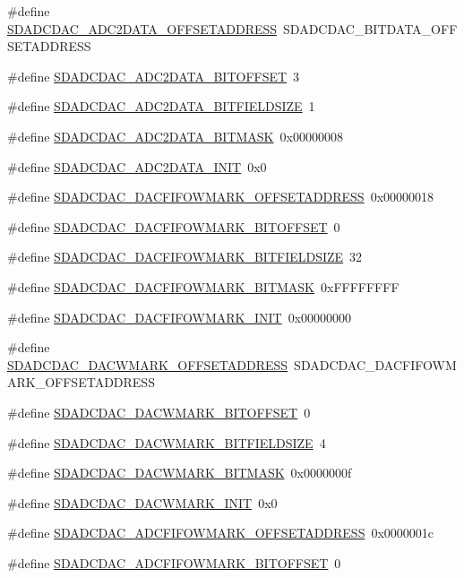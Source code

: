 \begin{DoxyCompactItemize}
\#define \hyperlink{a00569_a4b0d247763c945bcaf18e4bfa457e02b}{SDADCDAC\_\-ADC2DATA\_\-OFFSETADDRESS}~SDADCDAC\_\-BITDATA\_\-OFFSETADDRESS
\item 
\#define \hyperlink{a00569_a5b7ca50aa8e2de758a93edbd0c895710}{SDADCDAC\_\-ADC2DATA\_\-BITOFFSET}~3
\item 
\#define \hyperlink{a00569_aad45e46c76bcfe75f7e878228c30dbbb}{SDADCDAC\_\-ADC2DATA\_\-BITFIELDSIZE}~1
\item 
\#define \hyperlink{a00569_a8f0366c01e089c6281a66cbfcfcb833d}{SDADCDAC\_\-ADC2DATA\_\-BITMASK}~0x00000008
\item 
\#define \hyperlink{a00569_a53134035732160951d9c3d9c22896bbd}{SDADCDAC\_\-ADC2DATA\_\-INIT}~0x0
\item 
\#define \hyperlink{a00569_a68bfa2d51b499a57032027f8484bc441}{SDADCDAC\_\-DACFIFOWMARK\_\-OFFSETADDRESS}~0x00000018
\item 
\#define \hyperlink{a00569_a2bd7e99f1818987901db8be1279c3dc6}{SDADCDAC\_\-DACFIFOWMARK\_\-BITOFFSET}~0
\item 
\#define \hyperlink{a00569_a8fc2ad3f4a932ae1200e3549dabda5ae}{SDADCDAC\_\-DACFIFOWMARK\_\-BITFIELDSIZE}~32
\item 
\#define \hyperlink{a00569_a167e3e618d17b4dc7144716185903c6b}{SDADCDAC\_\-DACFIFOWMARK\_\-BITMASK}~0xFFFFFFFF
\item 
\#define \hyperlink{a00569_a8d0e77b1e65d96429afa91c798f1cbd2}{SDADCDAC\_\-DACFIFOWMARK\_\-INIT}~0x00000000
\item 
\#define \hyperlink{a00569_a0c1c021bbd07dfa175dabb78eb70bf3a}{SDADCDAC\_\-DACWMARK\_\-OFFSETADDRESS}~SDADCDAC\_\-DACFIFOWMARK\_\-OFFSETADDRESS
\item 
\#define \hyperlink{a00569_ad41ec5dec5d81ea3753ccec7c5231c27}{SDADCDAC\_\-DACWMARK\_\-BITOFFSET}~0
\item 
\#define \hyperlink{a00569_a58825d3fdedaf1cab0f3a6aef021f4a0}{SDADCDAC\_\-DACWMARK\_\-BITFIELDSIZE}~4
\item 
\#define \hyperlink{a00569_ae0771b9ccb58f4ec96bfe0e73e327067}{SDADCDAC\_\-DACWMARK\_\-BITMASK}~0x0000000f
\item 
\#define \hyperlink{a00569_ae2944f70260c8443ac3f2e0115524167}{SDADCDAC\_\-DACWMARK\_\-INIT}~0x0
\item 
\#define \hyperlink{a00569_a7ebd2dd537406b055a097acdf288b944}{SDADCDAC\_\-ADCFIFOWMARK\_\-OFFSETADDRESS}~0x0000001c
\item 
\#define \hyperlink{a00569_a678ebbfe469cad3a72194b4fd750f09a}{SDADCDAC\_\-ADCFIFOWMARK\_\-BITOFFSET}~0

\end{DoxyCompactItemize}
